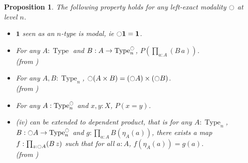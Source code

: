 \documentclass[conference]{IEEEtran}
\newtheorem{prop}[thm]{Proposition}
\DeclareMathOperator{\Type}{Type}
\newcommand{\modal}{\ensuremath{\ocircle}}
\newcommand \one {\mathbf{1}}
\begin{document}
\begin{prop}

The following property holds for any left-exact modality $\modal$ at
level $n$.
 
\begin{itemize}

\item $\one$ seen as an $n$-type is modal, ie $\modal \one =\one$.
\item 
  For any  $A:\Type$ and $B:A \to \Type_n^\modal$,  $P\left(\prod_{a:A} (B\,
  a)\right)$. \\
(from \cite[Lemma 7.7.2]{hottbook})
\item For any $A,B:\Type_n$,
  $\modal (A\times B) = (\modal A) \times (\modal B)$. \\
(from \cite[Corollary 7.7.2]{hottbook})
\item For any $A:\Type_n^\modal$ and $x,y:X$, $P(x=y)$.
\item 
  {\it (iv)} can be extended to dependent product, that is for any $A:\Type_n$, $B:\modal A \to
  \Type_n^\modal$ and
  $g:\prod_{a:A} B(\eta_A(a))$, there exists a map $f:\prod_{z:\modal
    A} (B\, z)$ such that for all $a:A$, $f(\eta_A(a)) = g(a)$. \\
 (from \cite[Theorem
 7.7.4]{hottbook})
\end{itemize}
\end{prop}
\end{document}
